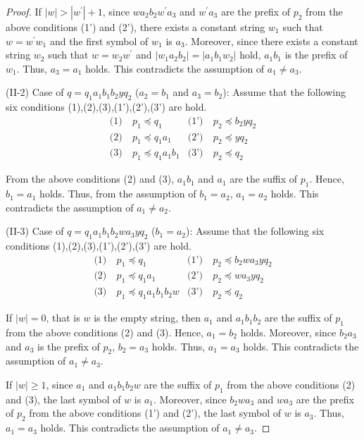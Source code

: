 \begin{proof}
If $|w| > |w^{\prime}|+1$, since $wa_{2}b_{2}w^{\prime}a_{3}$ and $w^{\prime}a_{3}$ are the prefix of $p_{2}$ from the above conditions (1') and (2'),
there exists a constant string $w_{1}$ such that $w=w^{\prime}w_{1}$ and the first symbol of $w_{1}$ is $a_{3}$.
Moreover, since there exists a constant string $w_{2}$ such that $w=w_{2}w^{\prime}$ and $|w_{1}a_{2}b_{2}|=|a_{1}b_{1}w_{2}|$ hold,
$a_{1}b_{1}$ is the prefix of $w_{1}$.
Thus, $a_{3}=a_{1}$ holds.
This contradicts the assumption of $a_{1} \ne a_{3}$.
\smallskip

\noindent
(II-2) Case of $q=q_{1}a_{1}b_{1}b_{2}yq_{2}$ ($a_{2}=b_{1}$ and $a_{3}=b_{2}$):
Assume that the following six conditions (1),(2),(3),(1'),(2'),(3') are hold.
\begin{align*}
\textrm{(1)}~& p_{1} \preceq q_{1} & \textrm{(1')}~& p_{2} \preceq b_{2}yq_{2} \\
\textrm{(2)}~& p_{1} \preceq q_{1}a_{1} & \textrm{(2')}~& p_{2} \preceq yq_{2} \\
\textrm{(3)}~& p_{1} \preceq q_{1}a_{1}b_{1} & \textrm{(3')}~& p_{2} \preceq q_{2}
\end{align*}

\noindent
From the above conditions (2) and (3), $a_{1}b_{1}$ and $a_{1}$ are the suffix of $p_{1}$.
Hence, $b_{1}=a_{1}$ holds.
Thus, from the assumption of $b_{1}=a_{2}$, $a_{1}=a_{2}$ holds.
This contradicts the assumption of $a_{1} \ne a_{2}$.
\smallskip

\noindent
(II-3) Case of $q=q_{1}a_{1}b_{1}b_{2}wa_{3}yq_{2}$ ($b_{1}=a_{2}$):
Assume that the following six conditions (1),(2),(3),(1'),(2'),(3') are hold.
\begin{align*}
\textrm{(1)}~& p_{1} \preceq q_{1} & \textrm{(1')}~& p_{2} \preceq b_{2}wa_{3}yq_{2} \\
\textrm{(2)}~& p_{1} \preceq q_{1}a_{1} & \textrm{(2')}~& p_{2} \preceq wa_{3}yq_{2} \\
\textrm{(3)}~& p_{1} \preceq q_{1}a_{1}b_{1}b_{2}w & \textrm{(3')}~& p_{2} \preceq q_{2}
\end{align*}

If $|w|=0$, that is $w$ is the empty string, then $a_{1}$ and $a_{1}b_{1}b_{2}$ are the suffix of $p_{1}$ from the above conditions (2) and (3).
Hence, $a_{1}=b_{2}$ holds.
Moreover, since $b_{2}a_{3}$ and $a_{3}$ is the prefix of $p_{2}$, $b_{2}=a_{3}$ holds.
Thus, $a_{1}=a_{3}$ holds.
This contradicts the assumption of $a_{1} \ne a_{3}$.

If $|w| \ge 1$, since $a_{1}$ and $a_{1}b_{1}b_{2}w$ are the suffix of $p_{1}$ from the above conditions (2) and (3),
the last symbol of $w$ is $a_{1}$.
Moreover, since $b_{2}wa_{3}$ and $wa_{3}$ are the prefix of $p_{2}$ from the above conditions (1') and (2'),
the last symbol of $w$ is $a_{3}$.
Thus, $a_{1}=a_{3}$ holds.
This contradicts the assumption of $a_{1} \ne a_{3}$.
\smallskip


\end{proof}
